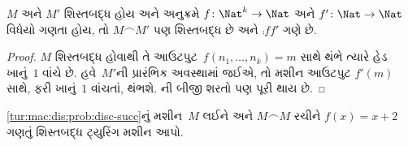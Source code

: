 \documentclass[../../../include/open-logic-section]{subfiles}
\begin{document}
\begin{prop}
    $M$ અને $M'$ શિસ્તબદ્ધ હોય અને અનુક્રમે
    $f\colon \Nat^k \to \Nat$ અને
    $f'\colon \Nat \to \Nat$ વિધેયો ગણતા હોય, તો
    $M \frown M'$ પણ શિસ્તબદ્ધ છે અને
    $\comp{f}{f'}$ ગણે છે.
\end{prop}

\begin{proof}
    $M$ શિસ્તબદ્ધ હોવાથી તે
    આઉટપુટ~$f(n_1,\dots,n_k) = m$ સાથે થંભે ત્યારે
    હેડ ખાનું~$1$ વાંચે છે. હવે~$M'$ની પ્રારંભિક
    અવસ્થામાં જઈએ, તો મશીન આઉટપુટ $f'(m)$ સાથે,
    ફરી ખાનું~$1$ વાંચતાં, થંભશે.
    ની બીજી શરતો પણ
    પૂરી થાય છે.
\end{proof}

\begin{prob}
    \cref{tur:mac:dis:prob:disc-succ}નું મશીન~$M$
    લઈને અને $M \frown M$ રચીને $f(x) = x+2$
    ગણતું શિસ્તબદ્ધ ટ્યુરિંગ મશીન આપો.
\end{prob}
\end{document}
